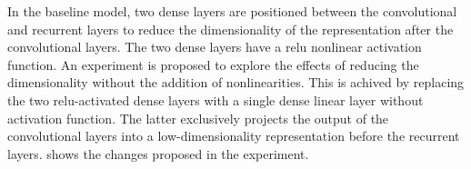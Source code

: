 
In the baseline model, two dense layers are positioned
between the convolutional and recurrent layers to reduce the
dimensionality of the representation after the convolutional
layers. The two dense layers have a \gls{relu} nonlinear
activation function. An experiment is proposed to explore
the effects of reducing the dimensionality without the
addition of nonlinearities. This is achived by replacing the
two \gls{relu}-activated dense layers with a single dense
linear layer without activation function. The latter
exclusively projects the output of the convolutional layers
into a low-dimensionality representation before the
recurrent layers.  shows the changes
proposed in the experiment. 

